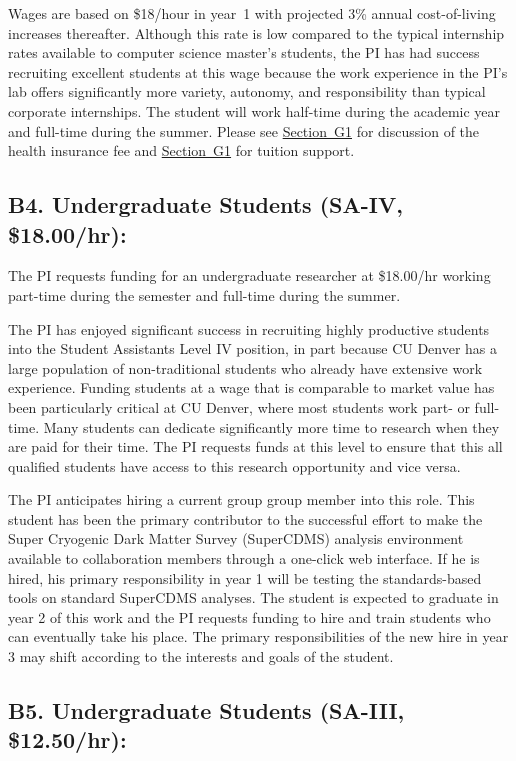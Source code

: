 \documentclass[11pt,oneside]{memoir}
\begin{document}
Wages are based on \$18/hour in year~1 with projected 3\% annual cost-of-living increases thereafter. Although this rate is low compared to the typical internship rates available to computer science master's students, the PI has had success recruiting excellent students at this wage because the work experience in the PI's lab offers significantly more variety, autonomy, and responsibility than typical corporate internships.  The student will work half-time during the academic year and full-time during the summer.  Please see \hyperref[sec:masters-health]{Section~G1} for discussion of the health insurance fee and \hyperref[sec:masters-tuition]{Section~G1} for tuition support.

\subsection{B4. Undergraduate Students (SA-IV, \$18.00/hr):}

The PI requests funding for an undergraduate researcher at \$18.00/hr working part-time during the semester and full-time during the summer.  

The PI has enjoyed significant success in recruiting highly productive students into the Student Assistants Level IV position, in part because CU Denver has a large population of non-traditional students who already have extensive work experience.
Funding students at a wage that is comparable to market value has been particularly critical at CU Denver, where most students work part- or full-time.  Many students can dedicate significantly more time to research when they are paid for their time.  The PI requests funds at this level to ensure that this all qualified students have access to this research opportunity and vice versa. 

The PI anticipates hiring a current group group member into this role.  This student has been the primary contributor to the successful effort to make the Super Cryogenic Dark Matter Survey (SuperCDMS) analysis environment available to collaboration members through a one-click web interface.  If he is hired, his primary responsibility in year 1 will be testing the standards-based tools on standard SuperCDMS analyses.  The student is expected to graduate in year 2 of this work and the PI requests funding to hire and train students who can eventually take his place.  The primary responsibilities of the new hire in year 3 may shift according to the interests and goals of the student.

\subsection{B5. Undergraduate Students (SA-III, \$12.50/hr):}
\end{document}
